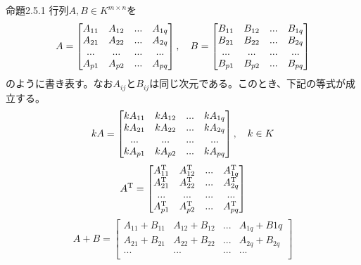 \documentclass[dvipdfmx, 9pt, a4paper]{jsarticle}
\numberwithin{equation}{subsection}
\begin{document}
\begin{itembox}[l]{命題2.5.1}
行列$A, B \in K^{m \times n}$を
\begin{equation}
A=
\begin{bmatrix}
A_{11} & A_{12} & ... & A_{1q} \\
A_{21} & A_{22} & ... & A_{2q} \\
... & ... & ... & ... \\
A_{p1} & A_{p2} & ... & A_{pq} \\
\end{bmatrix},~~~
B=
\begin{bmatrix}
B_{11} & B_{12} & ... & B_{1q} \\
B_{21} & B_{22} & ... & B_{2q} \\
... & ... & ... & ... \\
B_{p1} & B_{p2} & ... & B_{pq} \\
\end{bmatrix} \notag
\end{equation}
のように書き表す。なお$A_{ij}$と$B_{ij}$は同じ次元である。このとき、下記の等式が成立する。
\begin{equation}
kA=
\begin{bmatrix}
kA_{11} & kA_{12} & ... & kA_{1q} \\
kA_{21} & kA_{22} & ... & kA_{2q} \\
... & ... & ... & ... \\
kA_{p1} & kA_{p2} & ... & kA_{pq} \\
\end{bmatrix},~~~k \in K \notag
\end{equation}
\begin{equation}
A^{\rm T}=
\begin{bmatrix}
A^{\rm T}_{11} & A^{\rm T}_{12} & ... & A^{\rm T}_{1q} \\
A^{\rm T}_{21} & A^{\rm T}_{22} & ... & A^{\rm T}_{2q} \\
... & ... & ... & ... \\
A^{\rm T}_{p1} & A^{\rm T}_{p2} & ... & A^{\rm T}_{pq} \\
\end{bmatrix} \notag
\end{equation}
\begin{equation}
A + B = 
\begin{bmatrix}
A_{11}+B_{11} & A_{12}+B_{12} & ... & A_{1q}+B{1q} \\
A_{21}+B_{21} & A_{22}+B_{22} & ... & A_{2q}+B_{2q} \\
... & ... & ... & ... \\

\end{bmatrix}
\end{equation}
\end{itembox}
\end{document}
